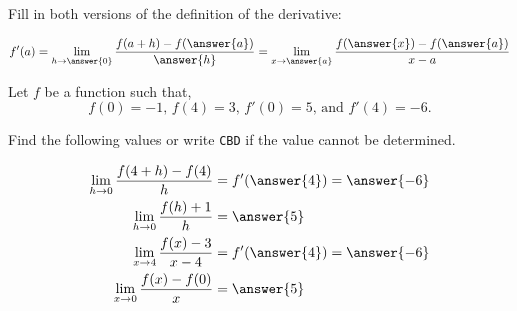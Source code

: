 \documentclass{ximera}
\author{Nela Lakos \and Kyle Parsons \and Bobby Ramsey}
\begin{document}
\begin{exercise}

	Fill in both versions of the definition of the derivative: 
	
	\[ f'(a) = \lim_{h \to \answer{0}} \dfrac{f(a+h)-f(\answer{a})}{\answer{h}} = \lim_{x\to \answer{a}} \dfrac{f(\answer{x})-f(\answer{a})}{x-a} \]

	\begin{exercise}
	
	Let $f$ be a function such that,
	\[
	f(0)=-1\text{, } f(4)=3\text{, }  f'(0)=5\text{, and } f'(4)=-6.
	\]
	
	Find the following values or write \verb+CBD+ if the value cannot be determined.
	
	\begin{align*}
		\lim_{h\to0}\frac{f(4+h)-f(4)}{h} &= f'(\answer{4}) = \answer{-6}\\
		\lim_{h\to0}\frac{f(h)+1}{h} &= \answer{5}\\
		\lim_{x\to4}\frac{f(x)-3}{x-4} &= f'(\answer{4}) =\answer{-6}\\
		\lim_{x\to0}\frac{f(x)-f(0)}{x} &= \answer{5}
	\end{align*}
	
	\end{exercise}
\end{exercise}
\end{document}

